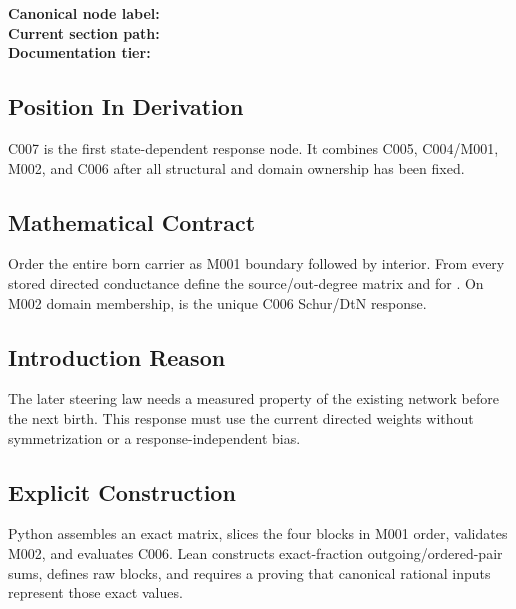 \textbf{Canonical node label:} \texttt{\protect{}}\\
\textbf{Current section path:} \texttt{\protect{}}\\
\textbf{Documentation tier:} \texttt{\protect{}}

\subsection{Position In Derivation}\label{position-in-derivation-17}

C007 is the first state-dependent response node. It combines C005,
C004/M001, M002, and C006 after all structural and domain ownership has
been fixed.

\subsection{Mathematical Contract}\label{mathematical-contract-8}

Order the entire born carrier as M001 boundary followed by interior.
From every stored directed conductance define the source/out-degree
matrix \texttt{\protect{}} and
\texttt{\protect{}} for \texttt{\protect{}}. On M002 domain
membership, \texttt{\protect{}} is the unique C006 Schur/DtN
response.

\subsection{Introduction Reason}\label{introduction-reason-20}

The later steering law needs a measured property of the existing network
before the next birth. This response must use the current directed
weights without symmetrization or a response-independent bias.

\subsection{Explicit Construction}\label{explicit-construction-8}

Python assembles an exact \texttt{\protect{}} matrix, slices the four
blocks in M001 order, validates M002, and evaluates C006. Lean
constructs exact-fraction outgoing/ordered-pair sums, defines raw
blocks, and requires a \texttt{\protect{}} proving
that canonical rational inputs represent those exact values.

